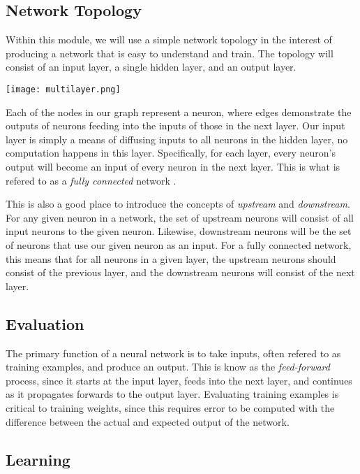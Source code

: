 \documentclass[a4paper, 11pt]{article} %
\begin{document}
\subsection*{Network Topology}

Within this module, we will use a simple network topology in the interest of producing a network that is easy to understand and train.  The topology will consist of an input layer, a single hidden layer, and an output layer.

\texttt{[image: multilayer.png]}

Each of the nodes in our graph represent a neuron, where edges demonstrate the outputs of neurons feeding into the inputs of those in the next layer.  Our input layer is simply a means of diffusing inputs to all neurons in the hidden layer, no computation happens in this layer.  Specifically, for each layer, every neuron's output will become an input of every neuron in the next layer.  This is what is refered to as a \textit{fully connected} network \cite{mitchell}.

This is also a good place to introduce the concepts of \textit{upstream} and \textit{downstream}.  For any given neuron in a network, the set of upstream neurons will consist of all input neurons to the given neuron.  Likewise, downstream neurons will be the set of neurons that use our given neuron as an input.  For a fully connected network, this means that for all neurons in a given layer, the upstream neurons should consist of the previous layer, and the downstream neurons will consist of the next layer.

\subsection*{Evaluation}

The primary function of a neural network is to take inputs, often refered to as training examples, and produce an output.  This is know as the \textit{feed-forward} process, since it starts at the input layer, feeds into the next layer, and continues as it propagates forwards to the output layer.  Evaluating training examples is critical to training weights, since this requires error to be computed with the difference between the actual and expected output of the network.

\subsection*{Learning}
\end{document}
